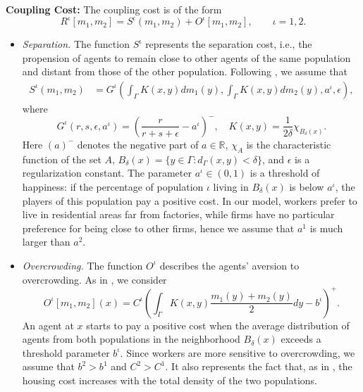 \documentclass[smallextended,referee,envcountsect,]{svjour3}
\begin{document}
\par\medskip\noindent
\textbf{Coupling Cost:} The coupling cost is of the form
$$
R^\iota[m_1, m_2] = S^\iota(m_1, m_2) + O^\iota[m_1, m_2], \qquad \iota=1,2.
$$
\begin{itemize}
    \item[(i)] \textit{Separation.} The function $S^\iota$ represents the separation cost, i.e., the propension of agents to remain close to other agents of the same population and distant from those of the other population. Following \cite{abc}, we assume that 
    \begin{align*}    
    S^\iota(m_1, m_2) &= G^\iota\left(\int_{\Gamma} K(x, y) dm_1(y), \int_{\Gamma} K(x, y) dm_2(y), a^\iota, \epsilon\right),
    \end{align*}
    where
    \[
    G^\iota(r,s,\epsilon,a^\iota) = \left(\frac{r}{r+s+\epsilon} - a^\iota\right)^-, \quad
    K(x, y) = \frac{1}{2\delta}\chi_{B_\delta(x)}.\]
    Here $(a)^-$ denotes the negative part of $a \in \mathbb{R}$, $\chi_A$ is the characteristic function of the set $A$, $B_\delta(x) = \{y \in \Gamma : d_\Gamma(x, y) < \delta\}$, and $\epsilon$ is a regularization constant. The parameter $a^\iota \in (0,1)$ is a threshold of happiness: if the percentage of population $\iota$ living in $B_\delta(x)$ is below $a^\iota$, the players of this population pay a positive cost. In our model, workers prefer to live in residential areas far from factories, while firms have no particular preference for being close to other firms, hence we assume that $a^1$ is much larger than $a^2$.
    \item[(ii)] \textit{Overcrowding.} The function $O^\iota$ describes the agents' aversion to overcrowding. As in \cite{abc}, we consider
    $$
    O^\iota[m_1, m_2](x) = C^\iota \left(\int_{\Gamma} K(x, y) \frac{m_1(y) + m_2(y)}{2} dy - b^\iota\right)^+.
    $$
    An agent at $x$ starts to pay a positive cost when the average distribution of agents from both populations in the neighborhood $B_\delta(x)$ exceeds a threshold parameter $b^\iota$. Since workers are more sensitive to overcrowding, we assume that $b^2 > b^1$ and $C^2 > C^1$. It also represents the fact that, as in \cite{barilla}, the housing cost increases with the total density of the two populations.  
\end{itemize}
\end{document}
